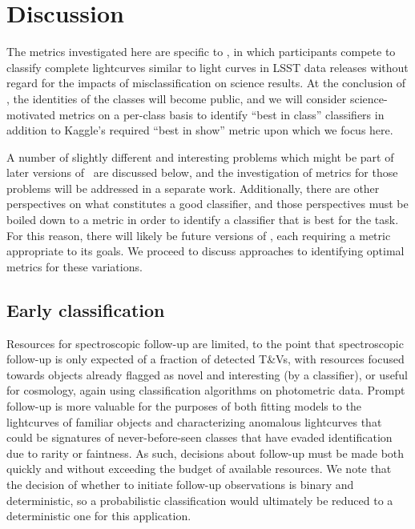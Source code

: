\section{Discussion}
\label{sec:discussion}

The metrics investigated here are specific to \plasticc, in which participants compete to classify complete lightcurves similar to light curves in LSST data releases without regard for the impacts of misclassification on science results.
At the conclusion of \plasticc, the identities of the classes will become public, and we will consider science-motivated metrics on a per-class basis to identify ``best in class'' classifiers in addition to Kaggle's required ``best in show'' metric upon which we focus here.

A number of slightly different and interesting problems which might be part of later versions of \plasticc\ are discussed below, and the investigation of metrics for those problems will be addressed in a separate work.
Additionally, there are other perspectives on what constitutes a good classifier, and those perspectives must be boiled down to a metric in order to identify a classifier that is best for the task.
For this reason, there will likely be future versions of \plasticc, each requiring a metric appropriate to its goals.
We proceed to discuss approaches to identifying optimal metrics for these variations.

\subsection{Early classification}
\label{sec:early}

Resources for spectroscopic follow-up are limited, to the point that spectroscopic follow-up is only expected of a fraction of detected T\&Vs, with resources focused towards objects already flagged as novel and interesting (by a classifier), or useful for cosmology, again using classification algorithms on photometric data.
Prompt follow-up is more valuable for the purposes of both fitting models to the lightcurves of familiar objects and characterizing anomalous lightcurves that could be signatures of never-before-seen classes that have evaded identification due to rarity or faintness.
As such, decisions about follow-up must be made both quickly and without exceeding the budget of available resources.
We note that the decision of whether to initiate follow-up observations is binary and deterministic, so a probabilistic classification would ultimately be reduced to a deterministic one for this application.

